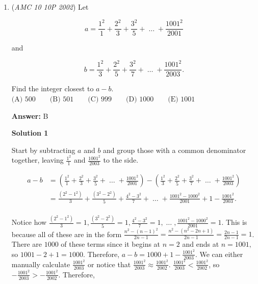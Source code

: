 \begin{enumerate}
 
Note: this solution misses two pairs. n=625 has four 5's, while 1625 has three. This would decrease our total by one. But, n=875 has three 5's, while 1875 has four. This would increase our total by one, thus cancelling out the impact of the other number this solution missed! The answer is thus still $\boxed{\textbf{(B) } 1}.$ (LOL) \href{https://artofproblemsolving.com/wiki/index.php?title=User:Sailingdog&action=edit&redlink=1}{Sailingdog} (\href{https://artofproblemsolving.com/wiki/index.php?title=User\_talk:Sailingdog&action=edit&redlink=1}{talk}) 19:43, 20 February 2026 (EST)

 


	\item (\textit{AMC 10 10P 2002}) Let

 \[a=\frac{1^2}{1} + \frac{2^2}{3} + \frac{3^2}{5} +  \; \dots \; + \frac{1001^2}{2001}\]


 and


 
 \[b=\frac{1^2}{3} + \frac{2^2}{5} + \frac{3^2}{7} +  \; \dots \; + \frac{1001^2}{2003}.\]


 Find the integer closest to $a-b.$
$\text{(A) }500 \qquad \text{(B) }501 \qquad \text{(C) }999 \qquad \text{(D) }1000 \qquad \text{(E) }1001$

 \textbf{Answer: }B



\textbf{Solution 1}

Start by subtracting $a$ and $b$ and group those with a common denominator together, leaving $\frac{1^2}{1}$ and $\frac{1001^2}{2003}$ to the side.

 \begin{align*}a-b&=(\frac{1^2}{1} + \frac{2^2}{3} + \frac{3^2}{5} +  \; \dots \; + \frac{1001^2}{2001}) - (\frac{1^2}{3} + \frac{2^2}{5} + \frac{3^2}{7} +  \; \dots \; + \frac{1001^2}{2003}) \\&=\frac{(2^2-1^2)}{3}+\frac{(3^2-2^2)}{5}+\frac{4^2-3^2}{7} + \; \dots \; + \frac{1001^2-1000^2}{2001} + 1 - \frac{1001^2}{2003}. \\\end{align*}


 Notice how $\frac{(2^2-1^2)}{3}=1, \frac{(3^2-2^2)}{5}=1, \frac{4^2-3^2}{7}=1, \; \dots \;, \frac{1001^2-1000^2}{2001}=1$. This is because all of these are in the form $\frac{n^2-(n-1)^2}{2n-1}=\frac{n^2-(n^2-2n+1)}{2n-1}=\frac{2n-1}{2n-1}=1$. There are $1000$ of these terms since it begins at $n=2$ and ends at $n=1001,$ so $1001-2+1=1000.$ Therefore, $a-b=1000+1 - \frac{1001^2}{2003}.$ We can either manually calculate $\frac{1001^2}{2003}$ or notice that $\frac{1001^2}{2003} \approx \frac{1001^2}{2002}.$ $\frac{1001^2}{2003} < \frac{1001^2}{2002}$, so $-\frac{1001^2}{2003} > -\frac{1001^2}{2002}.$ Therefore,


\end{enumerate}
